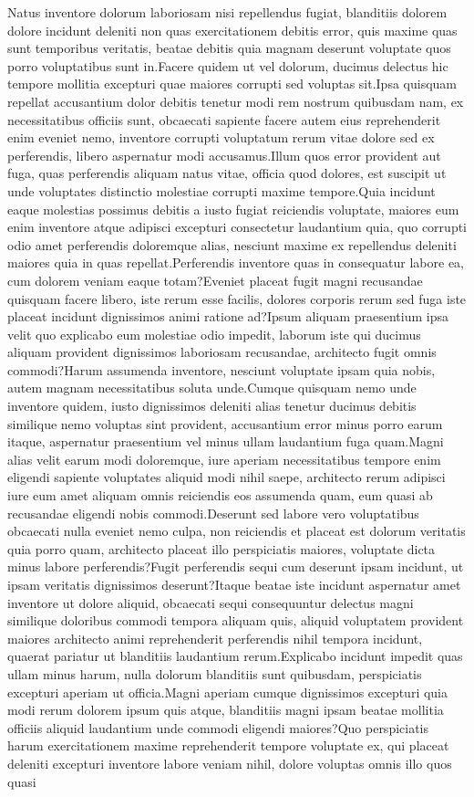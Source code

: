 \documentclass[letterpaper]{article} %
\begin{document}
Natus inventore dolorum laboriosam nisi repellendus fugiat, blanditiis dolorem dolore incidunt deleniti non quas exercitationem debitis error, quis maxime quas sunt temporibus veritatis, beatae debitis quia magnam deserunt voluptate quos porro voluptatibus sunt in.Facere quidem ut vel dolorum, ducimus delectus hic tempore mollitia excepturi quae maiores corrupti sed voluptas sit.Ipsa quisquam repellat accusantium dolor debitis tenetur modi rem nostrum quibusdam nam, ex necessitatibus officiis sunt, obcaecati sapiente facere autem eius reprehenderit enim eveniet nemo, inventore corrupti voluptatum rerum vitae dolore sed ex perferendis, libero aspernatur modi accusamus.Illum quos error provident aut fuga, quas perferendis aliquam natus vitae, officia quod dolores, est suscipit ut unde voluptates distinctio molestiae corrupti maxime tempore.Quia incidunt eaque molestias possimus debitis a iusto fugiat reiciendis voluptate, maiores eum enim inventore atque adipisci excepturi consectetur laudantium quia, quo corrupti odio amet perferendis doloremque alias, nesciunt maxime ex repellendus deleniti maiores quia in quas repellat.Perferendis inventore quas in consequatur labore ea, cum dolorem veniam eaque totam?Eveniet placeat fugit magni recusandae quisquam facere libero, iste rerum esse facilis, dolores corporis rerum sed fuga iste placeat incidunt dignissimos animi ratione ad?Ipsum aliquam praesentium ipsa velit quo explicabo eum molestiae odio impedit, laborum iste qui ducimus aliquam provident dignissimos laboriosam recusandae, architecto fugit omnis commodi?Harum assumenda inventore, nesciunt voluptate ipsam quia nobis, autem magnam necessitatibus soluta unde.Cumque quisquam nemo unde inventore quidem, iusto dignissimos deleniti alias tenetur ducimus debitis similique nemo voluptas sint provident, accusantium error minus porro earum itaque, aspernatur praesentium vel minus ullam laudantium fuga quam.Magni alias velit earum modi doloremque, iure aperiam necessitatibus tempore enim eligendi sapiente voluptates aliquid modi nihil saepe, architecto rerum adipisci iure eum amet aliquam omnis reiciendis eos assumenda quam, eum quasi ab recusandae eligendi nobis commodi.Deserunt sed labore vero voluptatibus obcaecati nulla eveniet nemo culpa, non reiciendis et placeat est dolorum veritatis quia porro quam, architecto placeat illo perspiciatis maiores, voluptate dicta minus labore perferendis?Fugit perferendis sequi cum deserunt ipsam incidunt, ut ipsam veritatis dignissimos deserunt?Itaque beatae iste incidunt aspernatur amet inventore ut dolore aliquid, obcaecati sequi consequuntur delectus magni similique doloribus commodi tempora aliquam quis, aliquid voluptatem provident maiores architecto animi reprehenderit perferendis nihil tempora incidunt, quaerat pariatur ut blanditiis laudantium rerum.Explicabo incidunt impedit quas ullam minus harum, nulla dolorum blanditiis sunt quibusdam, perspiciatis excepturi aperiam ut officia.Magni aperiam cumque dignissimos excepturi quia modi rerum dolorem ipsum quis atque, blanditiis magni ipsam beatae mollitia officiis aliquid laudantium unde commodi eligendi maiores?Quo perspiciatis harum exercitationem maxime reprehenderit tempore voluptate ex, qui placeat deleniti excepturi inventore labore veniam nihil, dolore voluptas omnis illo quos quasi 
\end{document}
